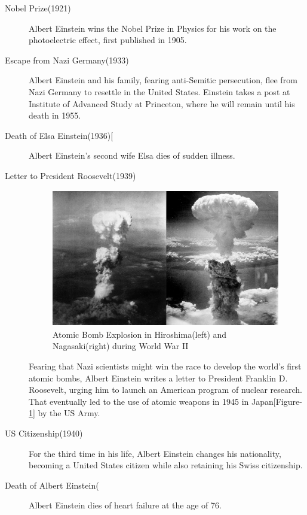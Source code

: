 \documentclass{article}
\begin{document}
\begin{description}
\item[Nobel Prize(1921)]
Albert Einstein wins the Nobel Prize in Physics for his work on the photoelectric effect, first published in 1905.

\item[Escape from Nazi Germany(1933)]
Albert Einstein and his family, fearing anti-Semitic persecution, flee from Nazi Germany to resettle in the United States. Einstein takes a post at Institute of Advanced Study at Princeton, where he will remain until his death in 1955.

\item[Death of Elsa Einstein(1936)[]
Albert Einstein's second wife Elsa dies of sudden illness.

\item[Letter to President Roosevelt(1939)]
\begin{figure}[b!]
    \centering
    \includegraphics[width=10cm,height=6cm]{figures/1200px-Atomic_bombing_of_Japan.jpg}
    \caption{Atomic Bomb Explosion in Hiroshima(left) and Nagasaki(right) during World War II}
    \label{fig:atomic_explode}
\end{figure}
Fearing that Nazi scientists might win the race to develop the world's first atomic bombs, Albert Einstein writes a letter to President Franklin D. Roosevelt, urging him to launch an American program of nuclear research.
That eventually led to the use of atomic weapons in 1945 in Japan[Figure-\ref{fig:atomic_explode}] by the US Army.


\item[US Citizenship(1940)]
For the third time in his life, Albert Einstein changes his nationality, becoming a United States citizen while also retaining his Swiss citizenship.

\item[Death of Albert Einstein(\date{Apr 18, 1955})]
Albert Einstein dies of heart failure at the age of 76.
\end{description}
\end{document}
